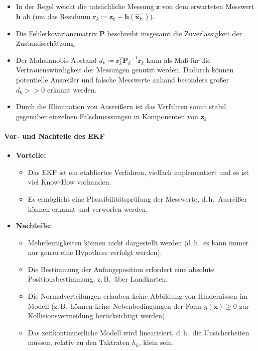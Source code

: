 \documentclass[a4paper, 11pt, accentcolor = tud3b]{tudreport}
\newcommand{\mat}[1]{\boldsymbol{#1}}
\renewcommand{\vec}[1]{\boldsymbol{#1}}
\renewcommand{\dh}{d.\,h.~}
\newcommand{\zB}{z.\,B.~}
\begin{document}
						\begin{itemize}
							\item In der Regel weicht die tatsächliche Messung \( \vec{z} \) von dem erwarteten Messwert \( \vec{h} \) ab (um das Residuum \( \vec{r}_k \coloneqq \vec{z}_k - \vec{h}(\hat{\vec{x}}_k^-) \)).
							\item Die Fehlerkovarianzmatrix \( \mat{P} \) beschreibt insgesamt die Zuverlässigkeit der Zustandsschätzung.
							\item Der Mahalanobis-Abstand \( d_k \coloneqq \vec{r}_k^T \mat{P}_k^{\,-1} \vec{r}_k \) kann als Maß für die Vertrauenswürdigkeit der Messungen genutzt werden. Dadurch können potentielle Ausreißer und falsche Messwerte anhand besonders großer \( d_k >> 0 \) erkannt werden.
							\item Durch die Elimination von Ausreißern ist das Verfahren somit stabil gegenüber einzelnen Falschmessungen in Komponenten von \( \vec{z}_k \).
						\end{itemize}
					
					\paragraph{Vor- und Nachteile des EKF}
						\begin{itemize}
							\item \textbf{Vorteile:}
								\begin{itemize}
									\item Das EKF ist ein etabliertes Verfahren, vielfach implementiert und es ist viel Know-How vorhanden.
									\item Es ermöglicht eine Plausibilitätsprüfung der Messwerte, \dh Ausreißer können erkannt und verworfen werden.
								\end{itemize}
							\item \textbf{Nachteile:}
								\begin{itemize}
									\item Mehrdeutigkeiten können nicht dargestellt werden (\dh es kann immer nur genau eine Hypothese verfolgt werden).
									\item Die Bestimmung der Anfangsposition erfordert eine absolute Positionsbestimmung, \zB über Landkarten.
									\item Die Normalverteilungen erlauben keine Abbildung von Hindernissen im Modell (\zB können keine Nebenbedingungen der Form \( g(\vec{x}) \geq 0 \) zur Kollisionsvermeidung berücksichtigt werden).
									\item Das zeitkontinuierliche Modell wird linearisiert, \dh die Unsicherheiten müssen, relativ zu den Taktraten \( h_k \), klein sein.
								\end{itemize}
						\end{itemize}
\end{document}

